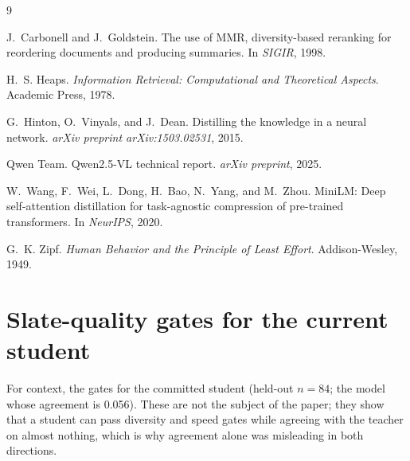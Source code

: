 \documentclass{article}
\begin{document}
\begin{thebibliography}{9}

J.~Carbonell and J.~Goldstein.
\newblock The use of MMR, diversity-based reranking for reordering documents and
producing summaries.
\newblock In \emph{SIGIR}, 1998.

H.~S. Heaps.
\newblock \emph{Information Retrieval: Computational and Theoretical Aspects}.
\newblock Academic Press, 1978.

G.~Hinton, O.~Vinyals, and J.~Dean.
\newblock Distilling the knowledge in a neural network.
\newblock \emph{arXiv preprint arXiv:1503.02531}, 2015.

Qwen Team.
\newblock Qwen2.5-VL technical report.
\newblock \emph{arXiv preprint}, 2025.

W.~Wang, F.~Wei, L.~Dong, H.~Bao, N.~Yang, and M.~Zhou.
\newblock MiniLM: Deep self-attention distillation for task-agnostic compression
of pre-trained transformers.
\newblock In \emph{NeurIPS}, 2020.

G.~K. Zipf.
\newblock \emph{Human Behavior and the Principle of Least Effort}.
\newblock Addison-Wesley, 1949.

\end{thebibliography}

\appendix
\section{Slate-quality gates for the current student}
\label{app:gates}
For context, the gates for the committed student (held-out $n=84$; the model
whose agreement is 0.056). These are not the subject of the paper; they show
that a student can pass diversity and speed gates while agreeing with the
teacher on almost nothing, which is why agreement alone was misleading in both
directions.
\end{document}

